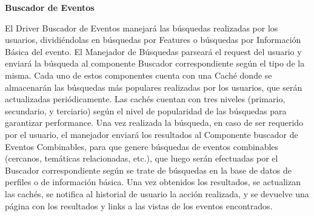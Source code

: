 \textbf{Buscador de Eventos}

El Driver Buscador de Eventos manejará las búsquedas realizadas por los usuarios, dividiéndolas en búsquedas por Features o búsquedas por Información Básica del evento. El Manejador de Búsquedas parseará el request del usuario y enviará la búsqueda al componente Buscador correspondiente según el tipo de la misma. Cada uno de estos componentes cuenta con una Caché donde se almacenarán las búsquedas más populares realizadas por los usuarios, que serán actualizadas periódicamente. Las cachés cuentan con tres niveles (primario, secundario, y terciario) según el nivel de popularidad de las búsquedas para garantizar performance. Una vez realizada la búsqueda, en caso de ser requerido por el usuario, el manejador enviará los resultados al Componente buscador de Eventos Combinables, para que genere búsquedas de eventos combinables (cercanos, temáticas relacionadas, etc.), que luego serán efectuadas por el Buscador correspondiente según se trate de búsquedas en la base de datos de perfiles o de información básica. Una vez obtenidos los resultados, se actualizan las cachés, se notifica al historial de usuario la acción realizada, y se devuelve una página con los resultados y links a las vistas de los eventos encontrados.
